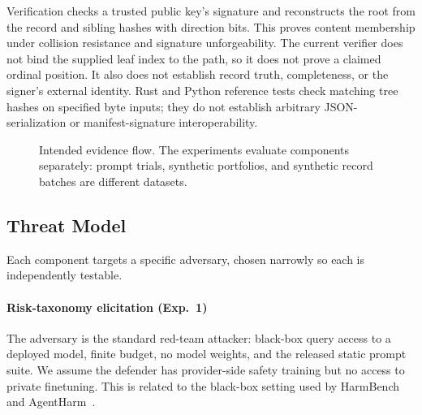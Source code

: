 Verification checks a trusted public key's signature and reconstructs the root from the record and sibling hashes with direction bits. This proves content membership under collision resistance and signature unforgeability. The current verifier does not bind the supplied leaf index to the path, so it does not prove a claimed ordinal position. It also does not establish record truth, completeness, or the signer's external identity. Rust and Python reference tests check matching tree hashes on specified byte inputs; they do not establish arbitrary JSON-serialization or manifest-signature interoperability.

\begin{figure}[htbp]
\centering
{}
\caption{Intended evidence flow. The experiments evaluate components separately: prompt trials, synthetic portfolios, and synthetic record batches are different datasets.}
\label{fig:pipeline}
\end{figure}

\subsection{Threat Model}
\label{sec:threatmodel}

Each component targets a specific adversary, chosen narrowly so each is independently testable.

\paragraph{Risk-taxonomy elicitation (Exp.~1)} The adversary is the standard red-team attacker: black-box query access to a deployed model, finite budget, no model weights, and the released static prompt suite. We assume the defender has provider-side safety training but no access to private finetuning. This is related to the black-box setting used by HarmBench~\cite{mazeika_2024_harmbench} and AgentHarm~\cite{andriushchenko_2025_agentharm}.


